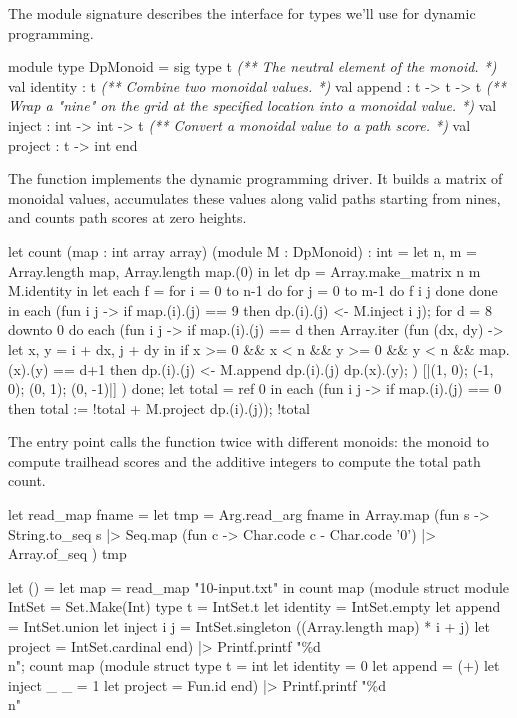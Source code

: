\documentclass{article}
\begin{document}
The  module signature describes the interface for types we’ll use for dynamic programming.

\begin{code}[ocaml]
module type DpMonoid = sig
  type t
  \emph{(** The neutral element of the monoid. *)}
  val identity : t
  \emph{(** Combine two monoidal values. *)}
  val append : t -> t -> t
  \emph{(** Wrap a "nine" on the grid at the specified location into a monoidal value. *)}
  val inject : int -> int -> t
  \emph{(** Convert a monoidal value to a path score. *)}
  val project : t -> int
end
\end{code}


The  function implements the dynamic programming driver.
It builds a matrix of monoidal values,
accumulates these values along valid paths starting from nines,
and counts path scores at zero heights.

\begin{code}[ocaml]
let count (map : int array array) (module M : DpMonoid) : int =
  let n, m = Array.length map, Array.length map.(0) in
  let dp = Array.make_matrix n m M.identity in
  let each f = for i = 0 to n-1 do for j = 0 to m-1 do f i j done done in
  each (fun i j -> if map.(i).(j) == 9 then dp.(i).(j) <- M.inject i j);
  for d = 8 downto 0 do
    each (fun i j -> if map.(i).(j) == d then
                       Array.iter (fun (dx, dy) ->
                           let x, y = i + dx, j + dy in
                           if x >= 0 && x < n && y >= 0 && y < n && map.(x).(y) == d+1 then
                             dp.(i).(j) <- M.append dp.(i).(j) dp.(x).(y);
                         ) [|(1, 0); (-1, 0); (0, 1); (0, -1)|]
      )
  done;
  let total = ref 0 in
  each (fun i j -> if map.(i).(j) == 0 then total := !total + M.project dp.(i).(j));
  !total
\end{code}


The entry point calls the  function twice with different monoids:
the  monoid to compute trailhead scores and the additive integers to compute the total path count.

\begin{code}[ocaml]
let read_map fname =
  let tmp = Arg.read_arg fname in
  Array.map (fun s ->
      String.to_seq s
      |> Seq.map (fun c -> Char.code c - Char.code '0')
      |> Array.of_seq
    ) tmp

let () =
  let map = read_map "10-input.txt" in
  count map (module struct
               module IntSet = Set.Make(Int)
               type t = IntSet.t
               let identity = IntSet.empty
               let append = IntSet.union
               let inject i j = IntSet.singleton ((Array.length map) * i + j)
               let project = IntSet.cardinal
             end)
  |> Printf.printf "\%d\\n";
  count map (module struct
               type t = int
               let identity = 0
               let append = (+)
               let inject _ _ = 1
               let project = Fun.id
             end)
  |> Printf.printf "\%d\\n"
\end{code}
\end{document}
